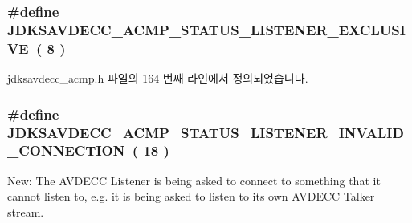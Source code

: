 \subsubsection[{\texorpdfstring{J\+D\+K\+S\+A\+V\+D\+E\+C\+C\+\_\+\+A\+C\+M\+P\+\_\+\+S\+T\+A\+T\+U\+S\+\_\+\+L\+I\+S\+T\+E\+N\+E\+R\+\_\+\+E\+X\+C\+L\+U\+S\+I\+VE}{JDKSAVDECC_ACMP_STATUS_LISTENER_EXCLUSIVE}}]{\setlength{\rightskip}{0pt plus 5cm}\#define J\+D\+K\+S\+A\+V\+D\+E\+C\+C\+\_\+\+A\+C\+M\+P\+\_\+\+S\+T\+A\+T\+U\+S\+\_\+\+L\+I\+S\+T\+E\+N\+E\+R\+\_\+\+E\+X\+C\+L\+U\+S\+I\+VE~( 8 )}\hypertarget{group__acmp__status_ga75c487c3c086705e3e374f533b572954}{}\label{group__acmp__status_ga75c487c3c086705e3e374f533b572954}


jdksavdecc\+\_\+acmp.\+h 파일의 164 번째 라인에서 정의되었습니다.

\subsubsection[{\texorpdfstring{J\+D\+K\+S\+A\+V\+D\+E\+C\+C\+\_\+\+A\+C\+M\+P\+\_\+\+S\+T\+A\+T\+U\+S\+\_\+\+L\+I\+S\+T\+E\+N\+E\+R\+\_\+\+I\+N\+V\+A\+L\+I\+D\+\_\+\+C\+O\+N\+N\+E\+C\+T\+I\+ON}{JDKSAVDECC_ACMP_STATUS_LISTENER_INVALID_CONNECTION}}]{\setlength{\rightskip}{0pt plus 5cm}\#define J\+D\+K\+S\+A\+V\+D\+E\+C\+C\+\_\+\+A\+C\+M\+P\+\_\+\+S\+T\+A\+T\+U\+S\+\_\+\+L\+I\+S\+T\+E\+N\+E\+R\+\_\+\+I\+N\+V\+A\+L\+I\+D\+\_\+\+C\+O\+N\+N\+E\+C\+T\+I\+ON~( 18 )}\hypertarget{group__acmp__status_ga690d24051c8046af540ceaad4dae56b7}{}\label{group__acmp__status_ga690d24051c8046af540ceaad4dae56b7}
New\+: The A\+V\+D\+E\+CC Listener is being asked to connect to something that it cannot listen to, e.\+g. it is being asked to listen to it\textquotesingle{}s own A\+V\+D\+E\+CC Talker stream. 

